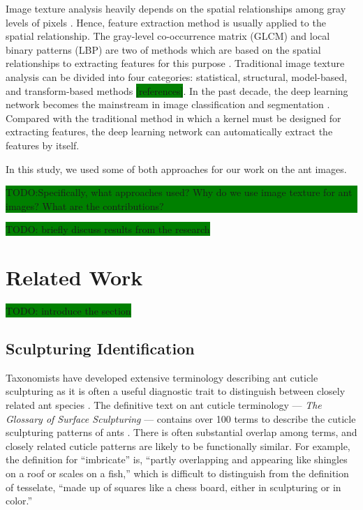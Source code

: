 \documentclass{aci}
\numberwithin{equation}{section}
\begin{document}
Image texture analysis heavily depends on the spatial relationships among gray
levels of pixels \cite{hung_image_2019}. Hence, feature extraction method is
usually applied to the spatial relationship. The gray-level co-occurrence matrix
(GLCM) and local binary patterns (LBP) are two of methods which are based on the
spatial relationships to extracting features for this purpose
\cite{haralick_textural_1973, goos_gray_2000}. Traditional image texture
analysis can be divided into four categories: statistical, structural,
model-based, and transform-based methods \colorbox{green}{[references]}. In the
past decade, the deep learning network becomes the mainstream in image
classification and segmentation \cite{liu_bow_2019}. Compared with the
traditional method in which a kernel must be designed for extracting features,
the deep learning network can automatically extract the features by itself.

In this study, we used some of both approaches for our work on the ant images.

\colorbox{green}{\parbox{\dimexpr\textwidth-2\fboxsep}{TODO:Specifically, what
        approaches used? Why do we use image texture for ant images? What are
        the contributions?}}

\colorbox{green}{TODO: briefly discuss results from the research}

\section{Related Work}

\colorbox{green}{TODO: introduce the section}

\subsection{Sculpturing Identification}
Taxonomists have developed extensive terminology describing ant cuticle
sculpturing as it is often a useful diagnostic trait to distinguish between
closely related ant species \cite{blaimer_taxonomy_2019,fisher_ants_2007}. The
definitive text on ant cuticle terminology — \textit{The Glossary of Surface
    Sculpturing} — contains over 100 terms to describe the cuticle sculpturing
patterns of ants \cite{harris_glossary_1979}. There is often substantial overlap
among terms, and closely related cuticle patterns are likely to be functionally
similar. For example, the definition for “imbricate” is, “partly overlapping and
appearing like shingles on a roof or scales on a fish,” which is difficult to
distinguish from the definition of tesselate, “made up of squares like a chess
board, either in sculpturing or in color.”
\end{document}
